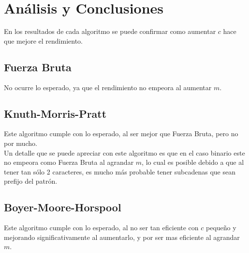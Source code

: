 \documentclass[14pt,letterpaper,hidelinks]{extarticle}
\begin{document}



\newpage
\section{Análisis y Conclusiones}
	En los resultados de cada algoritmo se puede confirmar como aumentar $c$ hace que mejore el rendimiento.
\subsection{Fuerza Bruta}
	No ocurre lo esperado, ya que el rendimiento no empeora al aumentar $m$.

\subsection{Knuth-Morris-Pratt}
	Este algoritmo cumple con lo esperado, al ser mejor que Fuerza Bruta, pero no por mucho.\\
	Un detalle que se puede apreciar con este algoritmo es que en el caso binario este no empeora como Fuerza Bruta al agrandar $m$, lo
	cual es posible debido a que al tener tan sólo 2 caracteres, es mucho más probable tener subcadenas que sean prefijo del patrón.

\subsection{Boyer-Moore-Horspool}
	Este algoritmo cumple con lo esperado, al no ser tan eficiente con $c$ pequeño y mejorando significativamente al aumentarlo, y por
	ser mas eficiente al agrandar $m$.
\end{document}

